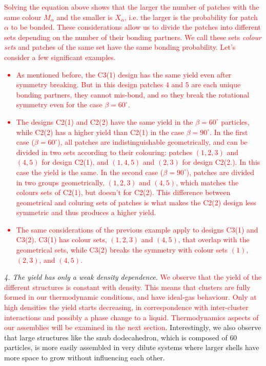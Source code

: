 \documentclass[a4paper, amsfonts, amssymb, amsmath, reprint, showkeys, nofootinbib, twoside]{revtex4-1}
\begin{document}
\textcolor{red}{Solving the equation above shows that the larger the number of patches with the same colour $M_\alpha$ and the smaller is $X_\alpha$, i.e. the larger is the probability for patch $\alpha$ to be bonded. These considerations allow us to divide the patches into different sets depending on the number of their bonding partners. We call these sets \emph{colour sets} and patches of the same set have the same bonding probability. Let's consider a few significant examples.
\begin{itemize}
\item As mentioned before, the C3(1) design has the same yield even after symmetry breaking. But in this design patches $4$ and $5$ are each unique bonding partners, they cannot mis-bond, and so they break the rotational symmetry even for the case $\beta=60^\circ$.
\item The designs C2(1) and C2(2) have the same yield in the $\beta=60^\circ$ particles, while C2(2) has a higher yield than C2(1) in the case $\beta=90^\circ$. In the first case ($\beta=60^\circ$), all patches are indistinguishable geometrically, and can be divided in two sets according to their colouring: patches $(1,2,3)$ and $(4,5)$ for design C2(1), and $(1,4,5)$ and $(2,3)$ for design C2(2.). In this case the yield is the same. In the second case ($\beta=90^\circ$), patches are divided in two groups geometrically, $(1,2,3)$ and $(4,5)$, which matches the colours sets of C2(1), but doesn't for C2(2). This difference between geometrical and coluring sets of patches is what makes the C2(2) design less symmetric and thus produces a higher yield.
\item The same considerations of the previous example apply to designs C3(1) and C3(2). C3(1) has colour sets, $(1,2,3)$ and $(4,5)$, that overlap with the geometrical sets, while C3(2) breaks the symmetry with colour sets $(1)$, $(2,3)$, and $(4,5)$.
\end{itemize}
}

\noindent
\emph{4. The yield has only a weak density dependence.} \textcolor{red}{We observe that the yield of the different structures is constant with density. This means that clusters are fully formed in our thermodynamic conditions, and have ideal-gas behaviour. Only at high densities the yield starts decreasing, in correspondence with inter-cluster interactions and possibly a phase change to a liquid. Thermodynamics aspects of our assemblies will be examined in the next section}. Interestingly, we also observe that large structures like the snub dodecahedron, which is composed of $60$ particles, is more easily assembled in very dilute systems where larger shells have more space to grow without influencing each other.
\end{document}
